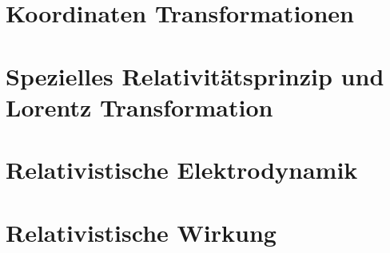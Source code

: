 \section{Koordinaten Transformationen}%
\label{sec:raum-transformationen}

\newpage
\section{Spezielles Relativitätsprinzip und Lorentz Transformation}%
\label{sec:spezielles-relativitaetsprinzip}

\newpage
\section{Relativistische Elektrodynamik}%
\label{sec:relativistische-elektrodynamik}

\newpage
\section{Relativistische Wirkung}%
\label{sec:relativistische-wirkung}
